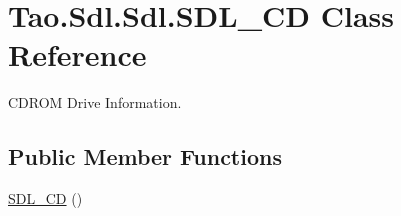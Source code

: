 \hypertarget{class_tao_1_1_sdl_1_1_sdl_1_1_s_d_l___c_d}{
\section{Tao.Sdl.Sdl.SDL\_\-CD Class Reference}
\label{class_tao_1_1_sdl_1_1_sdl_1_1_s_d_l___c_d}
}


CDROM Drive Information.  


\subsection*{Public Member Functions}
\begin{DoxyCompactItemize}
\item 
\hyperlink{class_tao_1_1_sdl_1_1_sdl_1_1_s_d_l___c_d_aa962f3726d70beffc8924c51382e22d2}{SDL\_\-CD} ()
\end{DoxyCompactItemize}
